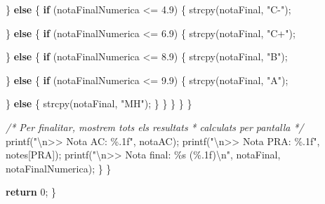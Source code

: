 \documentclass[]{book}
\newenvironment{Shaded}{\begin{snugshade}}{\end{snugshade}}
\newcommand{\CommentTok}[1]{\textcolor[rgb]{0.56,0.35,0.01}{\textit{#1}}}
\newcommand{\ControlFlowTok}[1]{\textcolor[rgb]{0.13,0.29,0.53}{\textbf{#1}}}
\newcommand{\DecValTok}[1]{\textcolor[rgb]{0.00,0.00,0.81}{#1}}
\newcommand{\FloatTok}[1]{\textcolor[rgb]{0.00,0.00,0.81}{#1}}
\newcommand{\NormalTok}[1]{#1}
\newcommand{\SpecialCharTok}[1]{\textcolor[rgb]{0.00,0.00,0.00}{#1}}
\newcommand{\StringTok}[1]{\textcolor[rgb]{0.31,0.60,0.02}{#1}}
\begin{document}
\begin{Shaded}
\begin{Highlighting}[]
\NormalTok{            \} }\ControlFlowTok{else}\NormalTok{ \{}
                \ControlFlowTok{if}\NormalTok{ (notaFinalNumerica \textless{}= }\FloatTok{4.9}\NormalTok{) \{}
\NormalTok{                    strcpy(notaFinal, }\StringTok{"C{-}"}\NormalTok{);}

\NormalTok{                \} }\ControlFlowTok{else}\NormalTok{ \{}
                    \ControlFlowTok{if}\NormalTok{ (notaFinalNumerica \textless{}= }\FloatTok{6.9}\NormalTok{) \{}
\NormalTok{                        strcpy(notaFinal, }\StringTok{"C+"}\NormalTok{);}

\NormalTok{                    \} }\ControlFlowTok{else}\NormalTok{ \{}
                        \ControlFlowTok{if}\NormalTok{ (notaFinalNumerica \textless{}= }\FloatTok{8.9}\NormalTok{) \{}
\NormalTok{                            strcpy(notaFinal, }\StringTok{"B"}\NormalTok{);}

\NormalTok{                        \} }\ControlFlowTok{else}\NormalTok{ \{}
                            \ControlFlowTok{if}\NormalTok{ (notaFinalNumerica \textless{}= }\FloatTok{9.9}\NormalTok{) \{}
\NormalTok{                                strcpy(notaFinal, }\StringTok{"A"}\NormalTok{);}

\NormalTok{                            \} }\ControlFlowTok{else}\NormalTok{ \{}
\NormalTok{                                strcpy(notaFinal, }\StringTok{"MH"}\NormalTok{);}
\NormalTok{                            \}}
\NormalTok{                        \}}
\NormalTok{                    \}}
\NormalTok{                \}}
\NormalTok{            \}}

            \CommentTok{/* Per finalitar, mostrem tots els resultats}
\CommentTok{             * calculats per pantalla}
\CommentTok{             */}
\NormalTok{            printf(}\StringTok{"}\SpecialCharTok{\textbackslash{}n}\StringTok{\textgreater{}\textgreater{} Nota AC: \%.1f"}\NormalTok{, notaAC);}
\NormalTok{            printf(}\StringTok{"}\SpecialCharTok{\textbackslash{}n}\StringTok{\textgreater{}\textgreater{} Nota PRA: \%.1f"}\NormalTok{, notes[PRA]);}
\NormalTok{            printf(}\StringTok{"}\SpecialCharTok{\textbackslash{}n}\StringTok{\textgreater{}\textgreater{} Nota final: \%s (\%.1f)}\SpecialCharTok{\textbackslash{}n}\StringTok{"}\NormalTok{, notaFinal, notaFinalNumerica);}
\NormalTok{        \}}
\NormalTok{    \}}

    \ControlFlowTok{return} \DecValTok{0}\NormalTok{;}
\NormalTok{\}}
\end{Highlighting}
\end{Shaded}
\end{document}

